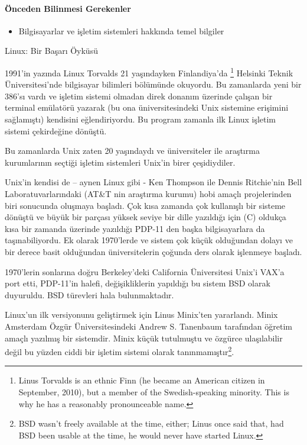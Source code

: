 \paragraph{Önceden Bilinmesi Gerekenler}
\begin{itemize}
 \item Bilgisayarlar ve işletim sistemleri hakkında temel bilgiler
 \end{itemize}
\begin{section}{Linux: Bir Başarı Öyküsü}

1991'in yazında Linux Torvalds 21 yaşındayken Finlandiya’da
\footnote{Linus Torvalds is an ethnic Finn (he became an American citizen in September, 2010), but a member of the Swedish-speaking minority. This is why he has a reasonably pronounceable name.} Helsinki Teknik Üniversitesi'nde bilgisayar bilimleri bölümünde okuyordu. Bu zamanlarda yeni bir 386'sı vardı ve işletim sistemi olmadan direk donanım üzerinde çalışan bir terminal emülatörü yazarak (bu ona üniversitesindeki Unix sistemine erişimini sağlamıştı) kendisini eğlendiriyordu.  Bu program zamanla ilk Linux işletim sistemi çekirdeğine dönüştü.

Bu zamanlarda Unix zaten 20 yaşındaydı ve üniversiteler ile araştırma kurumlarının seçtiği işletim sistemleri Unix'in birer çeşidiydiler.

Unix'in kendisi de – aynen Linux gibi - Ken Thompson ile Dennis Ritchie'nin Bell Laboratuvarlarındaki (AT\&T nin araştırma kurumu) hobi amaçlı projelerinden biri sonucunda oluşmaya başladı. Çok kısa zamanda çok kullanışlı bir sisteme dönüştü ve büyük bir parçası yüksek seviye bir dille yazıldığı için (C) oldukça kısa bir zamanda üzerinde yazıldığı PDP-11 den başka bilgisayarlara da taşınabiliyordu. Ek olarak 1970'lerde ve sistem çok küçük olduğundan dolayı ve bir derece basit olduğundan üniversitelerin çoğunda ders olarak işlenmeye başladı.

1970'lerin sonlarına doğru Berkeley'deki California Üniversitesi Unix'i VAX'a port etti, PDP-11'in halefi, değişikliklerin yapıldığı bu sistem BSD olarak duyuruldu. BSD türevleri hala bulunmaktadır.

Linux’un ilk versiyonunu geliştirmek için Linus Minix’ten yararlandı. Minix Amsterdam Özgür Üniversitesindeki Andrew S. Tanenbaum tarafından öğretim amaçlı yazılmış bir sistemdir. Minix küçük tutulmuştu ve özgürce ulaşılabilir değil bu yüzden ciddi bir işletim sistemi olarak tanınmamıştır\footnote{BSD wasn’t freely available at the time, either; Linus once said that, had BSD been usable at the time, he would never have started Linux.}.


\end{section}
